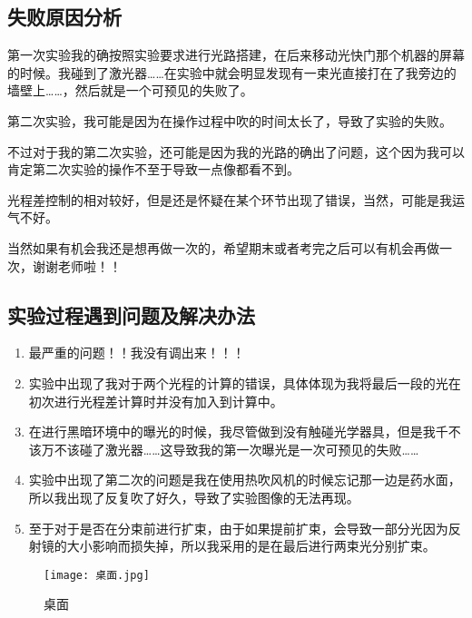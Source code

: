 \documentclass[dvipsnames, svgnames,a4paper,11pt]{article}
\begin{document}
	\subsection{失败原因分析}
	第一次实验我的确按照实验要求进行光路搭建，在后来移动光快门那个机器的屏幕的时候。我碰到了激光器……在实验中就会明显发现有一束光直接打在了我旁边的墙壁上……，然后就是一个可预见的失败了。

	第二次实验，我可能是因为在操作过程中吹的时间太长了，导致了实验的失败。
	
	不过对于我的第二次实验，还可能是因为我的光路的确出了问题，这个因为我可以肯定第二次实验的操作不至于导致一点像都看不到。

	光程差控制的相对较好，但是还是怀疑在某个环节出现了错误，当然，可能是我运气不好。

	当然如果有机会我还是想再做一次的，希望期末或者考完之后可以有机会再做一次，谢谢老师啦！！
	
	

	
	
	\subsection{实验过程遇到问题及解决办法}
	\begin{enumerate}
		\item 最严重的问题！！我没有调出来！！！
		\item 实验中出现了我对于两个光程的计算的错误，具体体现为我将最后一段的光在初次进行光程差计算时并没有加入到计算中。
		\item 在进行黑暗环境中的曝光的时候，我尽管做到没有触碰光学器具，但是我千不该万不该碰了激光器……这导致我的第一次曝光是一次可预见的失败……
		\item 实验中出现了第二次的问题是我在使用热吹风机的时候忘记那一边是药水面，所以我出现了反复吹了好久，导致了实验图像的无法再现。
		\item 至于对于是否在分束前进行扩束，由于如果提前扩束，会导致一部分光因为反射镜的大小影响而损失掉，所以我采用的是在最后进行两束光分别扩束。
	\end{enumerate}
	\begin{figure}[{H}]
		\centering
		\texttt{[image: 桌面.jpg]}
		\caption{桌面}
		\label{}
	\end{figure}
	
	
	
	
	
	
\end{document}
